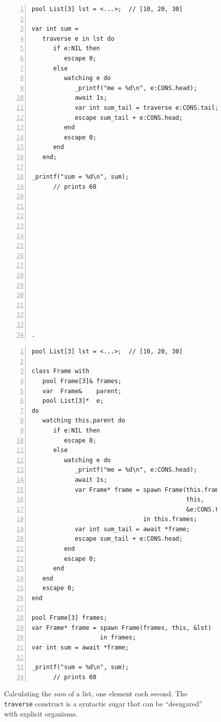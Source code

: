 \documentclass{sig-alternate}
\newcommand{\code}[1] {{\small{\texttt{#1}}}}
\begin{document}
\begin{figure}[t]
\begin{minipage}[t]{0.48\linewidth}
\begin{lstlisting}[numbers=left,xleftmargin=3.5em,title=CODE-1: Original code (with \code{traverse})]
pool List[3] lst = <...>;  // [10, 20, 30]

var int sum =
   traverse e in lst do
      if e:NIL then
         escape 0;
      else
         watching e do
            _printf("me = %d\n", e:CONS.head);
            await 1s;
            var int sum_tail = traverse e:CONS.tail;
            escape sum_tail + e:CONS.head;
         end
         escape 0;
      end
   end;

_printf("sum = %d\n", sum);
      // prints 60














.
\end{lstlisting}
\end{minipage}
%
\begin{minipage}[t]{0.52\linewidth}
\begin{lstlisting}[numbers=left,xleftmargin=3.5em,title=CODE-2: Expanded code (without \code{traverse})]
pool List[3] lst = <...>;  // [10, 20, 30]

class Frame with
   pool Frame[3]& frames;
   var  Frame&    parent;
   pool List[3]*  e;
do
   watching this.parent do
      if e:NIL then
         escape 0;
      else
         watching e do
            _printf("me = %d\n", e:CONS.head);
            await 1s;
            var Frame* frame = spawn Frame(this.frames,
                                           this,
                                           &e:CONS.tail);
                               in this.frames;
            var int sum_tail = await *frame;
            escape sum_tail + e:CONS.head;
         end
         escape 0;
      end
   end
   escape 0;
end

pool Frame[3] frames;
var Frame* frame = spawn Frame(frames, this, &lst)
                   in frames;
var int sum = await *frame;

_printf("sum = %d\n", sum);
      // prints 60
\end{lstlisting}
\end{minipage}
%
\caption{
Calculating the \emph{sum} of a list, one element each second.
The \code{traverse} construct is a syntactic sugar that can be ``desugared'' 
with explicit organisms.
\label{lst.list.sum.react}
}
\end{figure}
\end{document}
